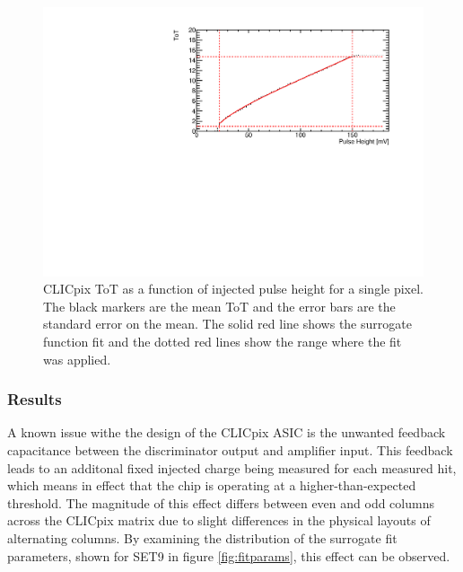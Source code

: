 \begin{figure}
\centering
\includegraphics[width=1.0\textwidth]{CLICdpVertex/Plots/TestPulseCalibration/Fits/Set9/ToT_PulseHeight_Set_9_ChipID_001ec0db94b1_Pixel_x0_y0_Fit.pdf}
\caption[CLICpix ToT as a function of injected pulse height.]{CLICpix ToT as a function of injected pulse height for a single pixel.  The black markers are the mean ToT and the error bars are the standard error on the mean.  The solid red line shows the surrogate function fit and the dotted red lines show the range where the fit was applied.}
\label{fig:testpulseexamplefit}
\end{figure}


\subsubsection{Results}
\label{sec:testpulsecalibrationresults}

A known issue withe the design of the CLICpix ASIC is the unwanted feedback capacitance between the discriminator output and amplifier input.  This feedback leads to an additonal fixed injected charge being measured for each measured hit, which means in effect that the chip is operating at a higher-than-expected threshold.  The magnitude of this effect differs between even and odd columns across the CLICpix matrix due to slight differences in the physical layouts of alternating columns.  By examining the distribution of the surrogate fit parameters, shown for SET9 in figure \ref{fig:fitparams}, this effect can be observed.  

